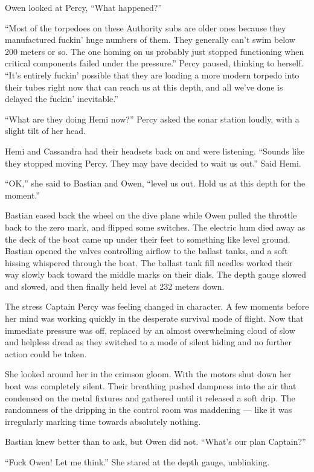 \documentclass[
]{scrbook}
\begin{document}
Owen looked at Percy, ``What happened?''

``Most of the torpedoes on these Authority subs are older ones because
they manufactured fuckin' huge numbers of them. They generally can't
swim below 200 meters or so. The one homing on us probably just stopped
functioning when critical components failed under the pressure.'' Percy
paused, thinking to herself. ``It's entirely fuckin' possible that they
are loading a more modern torpedo into their tubes right now that can
reach us at this depth, and all we've done is delayed the fuckin'
inevitable.''

``What are they doing Hemi now?'' Percy asked the sonar station loudly,
with a slight tilt of her head.

Hemi and Cassandra had their headsets back on and were listening.
``Sounds like they stopped moving Percy. They may have decided to wait
us out.'' Said Hemi.

``OK,'' she said to Bastian and Owen, ``level us out. Hold us at this
depth for the moment.''

Bastian eased back the wheel on the dive plane while Owen pulled the
throttle back to the zero mark, and flipped some switches. The electric
hum died away as the deck of the boat came up under their feet to
something like level ground. Bastian opened the valves controlling
airflow to the ballast tanks, and a soft hissing whispered through the
boat. The ballast tank fill needles worked their way slowly back toward
the middle marks on their dials. The depth gauge slowed and slowed, and
then finally held level at 232 meters down.

The stress Captain Percy was feeling changed in character. A few moments
before her mind was working quickly in the desperate survival mode of
flight. Now that immediate pressure was off, replaced by an almost
overwhelming cloud of slow and helpless dread as they switched to a mode
of silent hiding and no further action could be taken.

She looked around her in the crimson gloom. With the motors shut down
her boat was completely silent. Their breathing pushed dampness into the
air that condensed on the metal fixtures and gathered until it released
a soft drip. The randomness of the dripping in the control room was
maddening --- like it was irregularly marking time towards absolutely
nothing.

Bastian knew better than to ask, but Owen did not. ``What's our plan
Captain?''

``Fuck Owen! Let me think.'' She stared at the depth gauge, unblinking.
\end{document}
